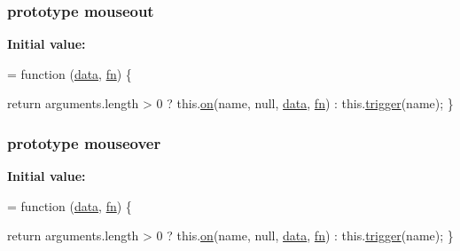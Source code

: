 \subsubsection[{\texorpdfstring{mouseout}{mouseout}}]{ {\bf prototype} mouseout}\hypertarget{jquery-2_82_81-vsdoc_8js_ac1acec291cac53826354688148db3718}{}\label{jquery-2_82_81-vsdoc_8js_ac1acec291cac53826354688148db3718}
{\bfseries Initial value\+:}
\begin{DoxyCode}
= \textcolor{keyword}{function} (\hyperlink{jquery-2_82_81-vsdoc_8js_a609407b3456fdc3c5671a9fc4a226ff7}{data}, \hyperlink{jquery-2_82_81-vsdoc_8js_acef6bdaf6b9b20fdcca1ea86f0902c3b}{fn}) \{
        

        \textcolor{keywordflow}{return} arguments.length > 0 ?
            this.\hyperlink{jquery-2_82_81-vsdoc_8js_ae453b412b883f60220d73468ef6c6dbc}{on}(name, null, \hyperlink{jquery-2_82_81-vsdoc_8js_a609407b3456fdc3c5671a9fc4a226ff7}{data}, \hyperlink{jquery-2_82_81-vsdoc_8js_acef6bdaf6b9b20fdcca1ea86f0902c3b}{fn}) :
            this.\hyperlink{jquery-2_82_81-vsdoc_8js_a2388c4114d5e3e4eab020f973641519c}{trigger}(name);
    \}
\end{DoxyCode}
\subsubsection[{\texorpdfstring{mouseover}{mouseover}}]{ {\bf prototype} mouseover}\hypertarget{jquery-2_82_81-vsdoc_8js_a6a0eb7aad006e81b9a2c40c51f12f04e}{}\label{jquery-2_82_81-vsdoc_8js_a6a0eb7aad006e81b9a2c40c51f12f04e}
{\bfseries Initial value\+:}
\begin{DoxyCode}
= \textcolor{keyword}{function} (\hyperlink{jquery-2_82_81-vsdoc_8js_a609407b3456fdc3c5671a9fc4a226ff7}{data}, \hyperlink{jquery-2_82_81-vsdoc_8js_acef6bdaf6b9b20fdcca1ea86f0902c3b}{fn}) \{
        

        \textcolor{keywordflow}{return} arguments.length > 0 ?
            this.\hyperlink{jquery-2_82_81-vsdoc_8js_ae453b412b883f60220d73468ef6c6dbc}{on}(name, null, \hyperlink{jquery-2_82_81-vsdoc_8js_a609407b3456fdc3c5671a9fc4a226ff7}{data}, \hyperlink{jquery-2_82_81-vsdoc_8js_acef6bdaf6b9b20fdcca1ea86f0902c3b}{fn}) :
            this.\hyperlink{jquery-2_82_81-vsdoc_8js_a2388c4114d5e3e4eab020f973641519c}{trigger}(name);
    \}
\end{DoxyCode}

